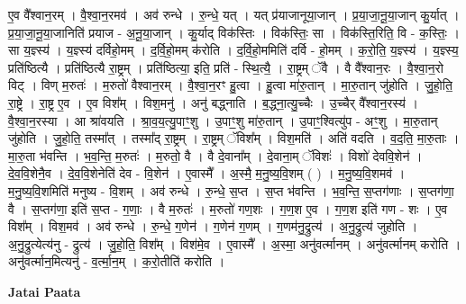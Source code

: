 \documentclass[17pt]{extarticle}
\begin{document}
ए॒व वै᳚श्वान॒रम् । वै॒श्वा॒न॒रमव॑ । अव॑ रुन्धे । रु॒न्धे॒ यत् । यत् प्र॑याजानूया॒जान् । प्र॒या॒जा॒नू॒या॒जान् कु॒र्यात् । प्र॒या॒जा॒नू॒या॒जानिति॑ प्रयाज - अ॒नू॒या॒जान् । कु॒र्याद् विक॑स्तिः । विक॑स्तिः॒ सा । विक॑स्ति॒रिति॒ वि - क॒स्तिः॒ । सा य॒ज्ञ्स्य॑ । य॒ज्ञ्स्य॑ दर्विहो॒मम् । द॒र्वि॒हो॒मम् क॑रोति । द॒र्वि॒हो॒ममिति॑ दर्वि - हो॒मम् । क॒रो॒ति॒ य॒ज्ञ्स्य॑ । य॒ज्ञ्स्य॒ प्रति॑ष्ठित्यै । प्रति॑ष्ठित्यै रा॒ष्ट्रम् । प्रति॑ष्ठित्या॒ इति॒ प्रति॑ - स्थि॒त्यै॒ । रा॒ष्ट्रम् ॅवै । वै वै᳚श्वान॒रः । वै॒श्वा॒न॒रो विट् । विण् म॒रुतः॑ । म॒रुतो॑ वैश्वान॒रम् । वै॒श्वा॒न॒रꣳ हु॒त्वा । हु॒त्वा मा॑रु॒तान् । मा॒रु॒तान् जु॑होति । जु॒हो॒ति॒ रा॒ष्ट्रे । रा॒ष्ट्र ए॒व । ए॒व विश᳚म् । विश॒मनु॑ । अनु॑ बद्ध्नाति । ब॒द्ध्ना॒त्यु॒च्चैः । उ॒च्चैर् वै᳚श्वान॒रस्य॑ । वै॒श्वा॒न॒रस्या । आ श्रा॑वयति । श्रा॒व॒य॒त्यु॒पाꣳ॒॒शु । उ॒पाꣳ॒॒शु मा॑रु॒तान् । उ॒पाꣳ॒॒श्वित्यु॑प - अꣳ॒॒शु । मा॒रु॒तान् जु॑होति । जु॒हो॒ति॒ तस्मा᳚त् । तस्मा᳚द् रा॒ष्ट्रम् । रा॒ष्ट्रम् ॅविश᳚म् । विश॒मति॑ । अति॑ वदति । व॒द॒ति॒ मा॒रु॒ताः । मा॒रु॒ता भ॑वन्ति । भ॒व॒न्ति॒ म॒रुतः॑ । म॒रुतो॒ वै । वै दे॒वाना᳚म् । दे॒वाना॒म् ॅविशः॑ । विशो॑ देववि॒शेन॑ । दे॒व॒वि॒शेनै॒व । दे॒व॒वि॒शेनेति॑ देव - वि॒शेन॑ । ए॒वास्मै᳚ । अ॒स्मै॒ म॒नु॒ष्य॒वि॒शम् ( ) । म॒नु॒ष्य॒वि॒शमव॑ । म॒नु॒ष्य॒वि॒शमिति॑ मनुष्य - वि॒शम् । अव॑ रुन्धे । रु॒न्धे॒ स॒प्त । स॒प्त भ॑वन्ति । भ॒व॒न्ति॒ स॒प्तग॑णाः । स॒प्तग॑णा॒ वै । स॒प्तग॑णा॒ इति॑ स॒प्त - ग॒णाः॒ । वै म॒रुतः॑ । म॒रुतो॑ गण॒शः । ग॒ण॒श ए॒व । ग॒ण॒श इति॑ गण - शः । ए॒व विश᳚म् । विश॒मव॑ । अव॑ रुन्धे । रु॒न्धे॒ ग॒णेन॑ । ग॒णेन॑ ग॒णम् । ग॒णम॑नु॒द्रुत्य॑ । अ॒नु॒द्रुत्य॑ जुहोति । अ॒नु॒द्रुत्येत्य॑नु - द्रुत्य॑ । जु॒हो॒ति॒ विश᳚म् । विश॑मे॒व । ए॒वास्मै᳚ । अ॒स्मा॒ अनु॑वर्त्मानम् । अनु॑वर्त्मानम् करोति । अनु॑वर्त्मान॒मित्यनु॑ - व॒र्त्मा॒न॒म् । क॒रो॒तीति॑ करोति । \newline

\textbf{Jatai Paata} \newline
\end{document}
